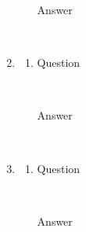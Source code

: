 \documentclass{article}
\begin{document}
\begin{enumerate}
\begin{enumerate}[label=(\alph*)]
\begin{description}
      \item[Answer] \hfill \\
      
    \end{description}
  \end{enumerate}
  
  \item
  \begin{enumerate}[label=(\alph*)]
    \item 
    \begin{description}
      \item[Question] \hfill \\

      \item[Answer] \hfill \\
      
    \end{description}
  \end{enumerate}
  
  \item
  \begin{enumerate}[label=(\alph*)]
    \item 
    \begin{description}
      \item[Question] \hfill \\

      \item[Answer] \hfill \\
      
    \end{description}
  \end{enumerate}
  
\end{enumerate}
\end{document}
